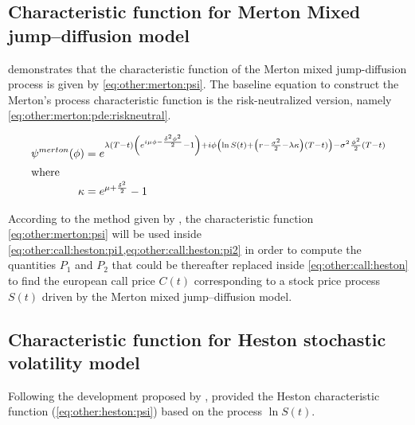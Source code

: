 \documentclass[12pt]{report}
\begin{document}
\subsection{Characteristic function for Merton Mixed jump--diffusion model}
\label{sub:other:option:merton}

\citet{matsuda2004} demonstrates that the characteristic function of the Merton mixed jump-diffusion process is given by \cref{eq:other:merton:psi}. The baseline equation to construct the Merton's process characteristic function is the risk-neutralized version, namely \cref{eq:other:merton:pde:riskneutral}.

\begin{align}
\psi^{merton}(\phi) &= e^{ 
  \lambda (T - t) \left( e^{i \mu \phi - \frac{\delta^2 \phi^2}{2}} - 1\right) +
  i \phi \left( \ln S(t) + \left(  r - \frac{\sigma^2}{2} - \lambda \kappa \right) (T - t) \right) -
  \sigma^2 \frac{\phi^2}{2} (T - t)
}
\label{eq:other:merton:psi} \\
\intertext{where}
\kappa &= e^{\mu + \frac{\delta^2}{2}} - 1 \notag \\
\end{align}
  
According to the method given by \citet{heston1993}, the characteristic function \ref{eq:other:merton:psi} will be used inside \cref{eq:other:call:heston:pi1,eq:other:call:heston:pi2} in order to compute the quantities $P_1$ and $P_2$ that could be thereafter replaced inside \cref{eq:other:call:heston} to find the european call price  $C(t)$ corresponding to a stock price process $S(t)$ driven by the Merton mixed jump--diffusion model.



\subsection{Characteristic function for Heston stochastic volatility model}
\label{sub:other:option:heston}

Following the development proposed by \citet{gatheral2006}, \citet{criso2015} provided the Heston characteristic function (\cref{eq:other:heston:psi}) based on the process $\ln S(t)$.
\end{document}
